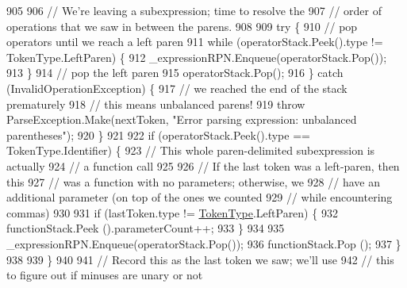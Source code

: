 \begin{DoxyCode}
905 
906                         \textcolor{comment}{// We're leaving a subexpression; time to resolve the}
907                         \textcolor{comment}{// order of operations that we saw in between the parens.}
908 
909                         \textcolor{keywordflow}{try} \{
910                             \textcolor{comment}{// pop operators until we reach a left paren}
911                             \textcolor{keywordflow}{while} (operatorStack.Peek().type != TokenType.LeftParen) \{
912                                 \_expressionRPN.Enqueue(operatorStack.Pop());
913                             \}
914                             \textcolor{comment}{// pop the left paren}
915                             operatorStack.Pop();
916                         \} \textcolor{keywordflow}{catch} (InvalidOperationException) \{
917                             \textcolor{comment}{// we reached the end of the stack prematurely}
918                             \textcolor{comment}{// this means unbalanced parens!}
919                             \textcolor{keywordflow}{throw} ParseException.Make(nextToken, \textcolor{stringliteral}{"Error parsing expression: unbalanced
       parentheses"});
920                         \}
921 
922                         \textcolor{keywordflow}{if} (operatorStack.Peek().type == TokenType.Identifier) \{
923                             \textcolor{comment}{// This whole paren-delimited subexpression is actually}
924                             \textcolor{comment}{// a function call}
925 
926                             \textcolor{comment}{// If the last token was a left-paren, then this}
927                             \textcolor{comment}{// was a function with no parameters; otherwise, we}
928                             \textcolor{comment}{// have an additional parameter (on top of the ones we counted}
929                             \textcolor{comment}{// while encountering commas)}
930 
931                             \textcolor{keywordflow}{if} (lastToken.type != \hyperlink{a00045_a301aa7c866593a5b625a8fc158bbeace}{TokenType}.LeftParen) \{
932                                 functionStack.Peek ().parameterCount++;
933                             \}
934 
935                             \_expressionRPN.Enqueue(operatorStack.Pop());
936                             functionStack.Pop ();
937                         \}
938 
939                     \}
940 
941                     \textcolor{comment}{// Record this as the last token we saw; we'll use}
942                     \textcolor{comment}{// this to figure out if minuses are unary or not}

\end{DoxyCode}
